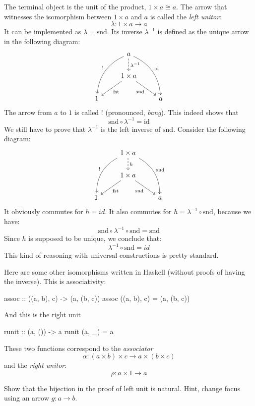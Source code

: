 \documentclass[DaoFP]{subfiles}
\begin{document}
The terminal object is the unit of the product, $1 \times a \cong a$. The arrow that witnesses the isomorphism between $1 \times a$ and $a$ is called the \emph{left unitor}:
\[ \lambda \colon 1 \times a \to a \]
It can be implemented as $\lambda = \text{snd}$. Its inverse $\lambda^{-1}$ is defined as the unique arrow in the following diagram:
\[
 \begin{tikzcd}
 &a
 \arrow[d, dashed, "\lambda^{-1}"]
 \arrow[ddl, bend right, "!"']
 \arrow[ddr, bend left, "\text{id}"]
 \\
 & 1 \times a
  \arrow[dl,  "\text{fst}"]
 \arrow[dr,   "\text{snd}"']
 \\
1 && a
 \end{tikzcd}
 \]
The arrow from $a$ to $1$ is called \index{!}$!$ (pronounced, \emph{bang}). This indeed shows that 
\[\text{snd} \circ \lambda^{-1} = \text{id} \] 
We still have to prove that $\lambda^{-1}$ is the left inverse of $\text{snd}$. Consider the following diagram:
\[
 \begin{tikzcd}
 &1 \times a
 \arrow[d, dashed, "h"]
 \arrow[ddl, bend right, "!"']
 \arrow[ddr, bend left, "\text{snd}"]
 \\
 & 1 \times a
  \arrow[dl,  "\text{fst}"]
 \arrow[dr,   "\text{snd}"']
 \\
1 && a
 \end{tikzcd}
 \]
 It obviously commutes for $h = id$. It also commutes for $h = \lambda^{-1}  \circ  \text{snd}$, because we have:
 \[  \text{snd} \circ \lambda^{-1}  \circ  \text{snd} = \text{snd} \]
 Since $h$ is supposed to be unique, we conclude that:
\[ \lambda^{-1}  \circ  \text{snd} = id \]
This kind of reasoning with universal constructions is pretty standard.

Here are some other isomorphisms written in Haskell (without proofs of having the inverse). This is associativity:
\begin{haskell}
assoc :: ((a, b), c) -> (a, (b, c))
assoc ((a, b), c) = (a, (b, c))
\end{haskell}
And this is the right unit
\begin{haskell}
runit :: (a, ()) -> a
runit (a, _) = a
\end{haskell}

These two functions correspond to the \emph{associator}
\[ \alpha \colon (a \times b) \times c \to a \times (b \times c) \]
and the \emph{right unitor}:
\[ \rho \colon a \times 1 \to a \]

\begin{exercise}
Show that the bijection in the proof of left unit is natural. Hint, change focus using an arrow $g \colon a \to b$.
\end{exercise}
\end{document}
